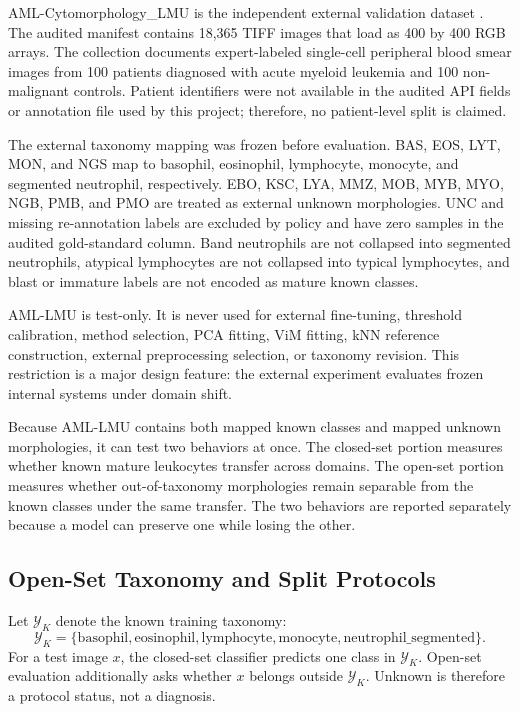 AML-Cytomorphology\_LMU is the independent external validation dataset \cite{aml_lmu_tcia_2019}. The audited manifest contains 18,365 TIFF images that load as 400 by 400 RGB arrays. The collection documents expert-labeled single-cell peripheral blood smear images from 100 patients diagnosed with acute myeloid leukemia and 100 non-malignant controls. Patient identifiers were not available in the audited API fields or annotation file used by this project; therefore, no patient-level split is claimed.

The external taxonomy mapping was frozen before evaluation. BAS, EOS, LYT, MON, and NGS map to basophil, eosinophil, lymphocyte, monocyte, and segmented neutrophil, respectively. EBO, KSC, LYA, MMZ, MOB, MYB, MYO, NGB, PMB, and PMO are treated as external unknown morphologies. UNC and missing re-annotation labels are excluded by policy and have zero samples in the audited gold-standard column. Band neutrophils are not collapsed into segmented neutrophils, atypical lymphocytes are not collapsed into typical lymphocytes, and blast or immature labels are not encoded as mature known classes.

AML-LMU is test-only. It is never used for external fine-tuning, threshold calibration, method selection, PCA fitting, ViM fitting, kNN reference construction, external preprocessing selection, or taxonomy revision. This restriction is a major design feature: the external experiment evaluates frozen internal systems under domain shift.

Because AML-LMU contains both mapped known classes and mapped unknown morphologies, it can test two behaviors at once. The closed-set portion measures whether known mature leukocytes transfer across domains. The open-set portion measures whether out-of-taxonomy morphologies remain separable from the known classes under the same transfer. The two behaviors are reported separately because a model can preserve one while losing the other.



\subsection{Open-Set Taxonomy and Split Protocols}

Let $\mathcal{Y}_K$ denote the known training taxonomy:
\[
\mathcal{Y}_K = \{\text{basophil}, \text{eosinophil}, \text{lymphocyte}, \text{monocyte}, \text{neutrophil\_segmented}\}.
\]
For a test image $x$, the closed-set classifier predicts one class in $\mathcal{Y}_K$. Open-set evaluation additionally asks whether $x$ belongs outside $\mathcal{Y}_K$. Unknown is therefore a protocol status, not a diagnosis.

